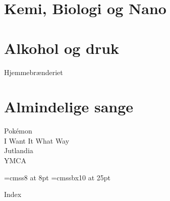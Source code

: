 \documentclass[a5paper]{book}
\let\oldmedskip\medskip
\renewcommand{\medskip}{\oldmedskip\pagebreak[2]}
\newcommand{\SBThechapter}[0]{}
\newcommand{\SBChapter}[1]{
    \startcontents
    \chapter*{#1} 
      \begin{minipage}{.8\textwidth}
        \printcontents{}{1}{}
      \end{minipage}%
    \renewcommand{\SBThechapter}{#1}
    \clearpage
}
\begin{document}
\onecolumn
\SBChapter{Kemi, Biologi og Nano}
\twocolumn
%
%
%


%
%


%

\onecolumn
\SBChapter{Alkohol og druk}
\twocolumn


Hjemmebrænderiet

\onecolumn
\SBChapter{Almindelige sange}
\twocolumn




Pokémon\\
I Want It What Way\\
Jutlandia\\
YMCA








% 


\clearpage
\font\myTinySF=cmss8    at  8pt
\font\myHugeSF=cmssbx10 at 25pt
\renewcommand{\indexspace}{\medskip}

{\parindent 8pt
  {\myTitleFont Index}}\par
\vskip 5pt
\renewcommand{\SBThechapter}{Index}
\renewcommand{\item}{\par\hangindent=40pt}
\renewcommand{\subitem}{\par\hangindent=40pt \hspace*{20pt}}
\renewcommand{\subsubitem}{\par\hangindent=40pt \hspace*{30pt}}


\end{document}
